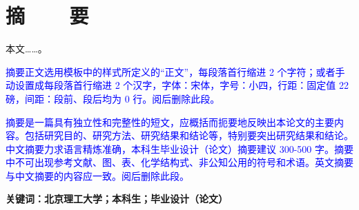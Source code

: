 %
%
%
%
%

\vspace*{-11mm}

\begin{center}
  \heiti{}\textbf{\thesisTitle}
\end{center}

\vspace*{2mm}

{\let\clearpage\relax \chapter*{\textmd{摘~~~~要}}}
\setcounter{page}{1}

\vspace*{1mm}

\setlength{\parskip}{0em}

本文……。

\textcolor{blue}{摘要正文选用模板中的样式所定义的“正文”，每段落首行缩进 2 个字符；或者手动设置成每段落首行缩进 2 个汉字，字体：宋体，字号：小四，行距：固定值 22 磅，间距：段前、段后均为 0 行。阅后删除此段。}

\textcolor{blue}{摘要是一篇具有独立性和完整性的短文，应概括而扼要地反映出本论文的主要内容。包括研究目的、研究方法、研究结果和结论等，特别要突出研究结果和结论。中文摘要力求语言精炼准确，本科生毕业设计（论文）摘要建议 300-500 字。摘要中不可出现参考文献、图、表、化学结构式、非公知公用的符号和术语。英文摘要与中文摘要的内容应一致。阅后删除此段。}

\vspace{4ex}\noindent\textbf{\heiti 关键词：北京理工大学；本科生；毕业设计（论文）}
\newpage

\vspace*{-2mm}

\begin{spacing}{0.95}
  \centering
  \heiti{}\textbf{\thesisTitleEN}
\end{spacing}

